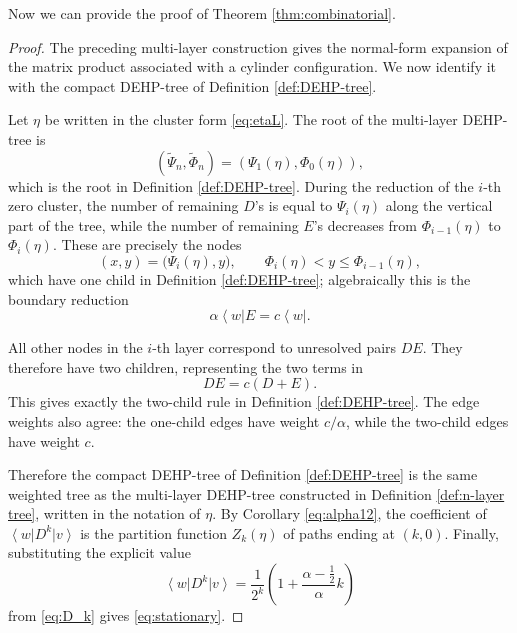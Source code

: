 \documentclass[12pt,a4paper]{amsart}
\newcommand{\bra}[1]{\left\langle #1\right|}
\newcommand{\ket}[1]{\left|#1\right\rangle}
\theoremstyle{remark}
\numberwithin{equation}{section} \numberwithin{theorem}{section}
\begin{document}
Now we can provide the proof of Theorem \ref{thm:combinatorial}.
\begin{proof}
The preceding multi-layer construction gives the normal-form expansion of the matrix product associated with a cylinder configuration. 
We now identify it with the compact DEHP-tree of Definition \ref{def:DEHP-tree}.

Let $\eta$ be written in the cluster form \eqref{eq:etaL}. 
The root of the multi-layer DEHP-tree is
\[
(\tilde\Psi_n,\tilde\Phi_n)
=
(\Psi_1(\eta),\Phi_0(\eta)),
\]
which is the root in Definition \ref{def:DEHP-tree}. 
During the reduction of the $i$-th zero cluster, the number of remaining $D$'s is equal to $\Psi_i(\eta)$ along the vertical part of the tree, while the number of remaining $E$'s decreases from $\Phi_{i-1}(\eta)$ to $\Phi_i(\eta)$. 
These are precisely the nodes
\[
(x,y)=\bigl(\Psi_i(\eta),y\bigr),
\qquad
\Phi_i(\eta)<y\leq \Phi_{i-1}(\eta),
\]
which have one child in Definition \ref{def:DEHP-tree}; algebraically this is the boundary reduction
\[
\alpha\bra{w}E=c\bra{w}.
\]

All other nodes in the $i$-th layer correspond to unresolved pairs $DE$. 
They therefore have two children, representing the two terms in
\[
DE=c(D+E).
\]
This gives exactly the two-child rule in Definition \ref{def:DEHP-tree}. 
The edge weights also agree: the one-child edges have weight $c/\alpha$, while the two-child edges have weight $c$.

Therefore the compact DEHP-tree of Definition \ref{def:DEHP-tree} is the same weighted tree as the multi-layer DEHP-tree constructed in Definition \ref{def:n-layer tree}, written in the notation of $\eta$. 
By Corollary \ref{eq:alpha12}, the coefficient of $\bra{w}D^k\ket{v}$ is the partition function $Z_k(\eta)$ of paths ending at $(k,0)$. 
Finally, substituting the explicit value
\[
\bra{w}D^k\ket{v}
=
\frac{1}{2^k}\left(1+\frac{\alpha-\frac12}{\alpha}k\right)
\]
from \eqref{eq:D_k} gives \eqref{eq:stationary}.
\end{proof}
\end{document}
